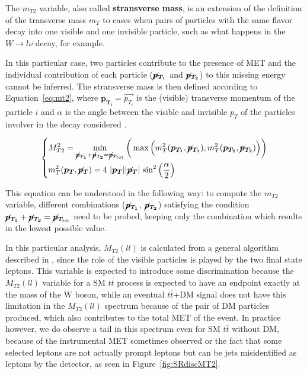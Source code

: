 \documentclass[a4paper, 10pt, openright]{report}
\begin{document}
The $m_{T2}$ variable, also called \textbf{stransverse mass}, is an extension of the definition of the transverse mass $m_T$ to cases when pairs of particles with the same flavor decay into one visible and one invisible particle, such as what happens in the $W \rightarrow l\nu$ decay, for example. 

In this particular case, two particles contribute to the presence of \ac{MET} and the individual contribution of each particle ($\bm{\cancel{p}_{T_{1}}}$ and $\bm{\cancel{p}_{T_2}}$) to this missing energy cannot be inferred. The stransverse mass is then defined according to Equation~\ref{eq:mt2}, where $\bm{p_{T_i}} = \overrightarrow{p_{T_i}}$ is the (visible) transverse momentum of the particle $i$ and $\alpha$ is the angle between the visible and invisible $p_T$ of the particles involver in the decay considered \cite{MT2}.

\begin{equation}
\label{eq:mt2}
\begin{dcases}
M_{T2}^2 = \min_{\bm{\cancel{p}_{T_{1}}} + \bm{\cancel{p}_{T_{2}}} = \bm{\cancel{p}_{T_{\text{tot}}}}} \bigg (\max \Big (m_T^2(\bm{p_{T_1}}, \bm{\cancel{p}_{T_{1}}}), m_T^2(\bm{p_{T_2}}, \bm{\cancel{p}_{T_{2}}}) \Big ) \bigg ) \\
m_T^2(\bm{p_{T}}, \bm{\cancel{p}_{T}}) = 4 \text{ } |\bm{p_{T}}| |\bm{\cancel{p}_{T}}| \text{ sin}^2 \left (\frac{\alpha}{2} \right ) 
\end{dcases}
\end{equation}

This equation can be understood in the following way: to compute the $m_{T2}$ variable, different combinations ($\bm{\cancel{p}_{T_{1}}}$, $\bm{\cancel{p}_{T_{2}}}$) satisfying the condition $\bm{\cancel{p}_{T_{1}}} + \bm{\cancel{p}_{T_{2}}} = \bm{\cancel{p}_{T_{\text{tot}}}}$ need to be probed, keeping only the combination which results in the lowest possible value.

In this particular analysis, $M_{T2}(ll)$ is calculated from a general algorithm described in \cite{MT2Calc}, since the role of the visible particles is played by the two final state leptons. This variable is expected to introduce some discrimination because the $M_{T2}(ll)$ variable for a \ac{SM} $t \bar t$ process is expected to have an endpoint exactly at the mass of the W boson, while an eventual $t \bar t$+DM signal does not have this limitation in the $M_{T2}(ll)$ spectrum because of the pair of \ac{DM} particles produced, which also contributes to the total \ac{MET} of the event. In practice however, we do observe a tail in this spectrum even for \ac{SM} $t \bar t$ without \ac{DM}, because of the instrumental \ac{MET} sometimes observed or the fact that some selected leptons are not actually prompt leptons but can be jets misidentified as leptons by the detector, as seen in Figure~\ref{fig:SRdiscMT2}.
\end{document}
